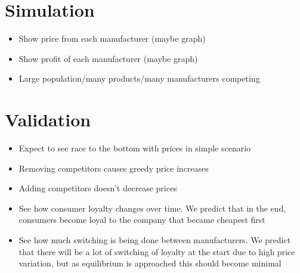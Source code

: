 \documentclass[11pt]{article}
\begin{document}
\section{Simulation}
\label{sec-3}

\begin{itemize}
\item Show price from each manufacturer (maybe graph)
\item Show profit of each manufacturer (maybe graph)
\item Large population/many products/many manufacturers competing
\end{itemize}
\section{Validation}
\label{sec-4}

\begin{itemize}
\item Expect to see race to the bottom with prices in simple scenario
\item Removing competitors causes greedy price increases
\item Adding competitors doesn't decrease prices
\item See how consumer loyalty changes over time. We predict that in the end, consumers become loyal to the company that became cheapest first
\item See how much switching is being done between manufacturers. We predict that there will be a lot of switching of loyalty at the start due to high price variation, but as equilibrium is approached this should become minimal
\end{itemize}
\end{document}
